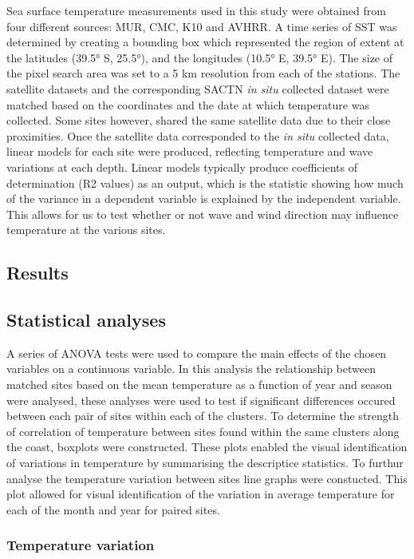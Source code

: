 \documentclass[12pt,A4paper,]{article}
\begin{document}
Sea surface temperature measurements used in this study were obtained
from four different sources: MUR, CMC, K10 and AVHRR. A time series of
SST was determined by creating a bounding box which represented the
region of extent at the latitudes (39.5° S, 25.5°), and the longitudes
(10.5° E, 39.5° E). The size of the pixel search area was set to a 5 km
resolution from each of the stations. The satellite datasets and the
corresponding SACTN \emph{in situ} collected dataset were matched based
on the coordinates and the date at which temperature was collected. Some
sites however, shared the same satellite data due to their close
proximities. Once the satellite data corresponded to the \emph{in situ}
collected data, linear models for each site were produced, reflecting
temperature and wave variations at each depth. Linear models typically
produce coefficients of determination (R2 values) as an output, which is
the statistic showing how much of the variance in a dependent variable
is explained by the independent variable. This allows for us to test
whether or not wave and wind direction may influence temperature at the
various sites.

\subsection{Results}\label{results}

\subsection{Statistical analyses}\label{statistical-analyses}

A series of ANOVA tests were used to compare the main effects of the
chosen variables on a continuous variable. In this analysis the
relationship between matched sites based on the mean temperature as a
function of year and season were analysed, these analyses were used to
test if significant differences occured between each pair of sites
within each of the clusters. To determine the strength of correlation of
temperature between sites found within the same clusters along the
coast, boxplots were constructed. These plots enabled the visual
identification of variations in temperature by summarising the
descriptice statistics. To furthur analyse the temperature variation
between sites line graphs were constucted. This plot allowed for visual
identification of the variation in average temperature for each of the
month and year for paired sites.

\subsubsection{Temperature variation}\label{temperature-variation}
\end{document}
